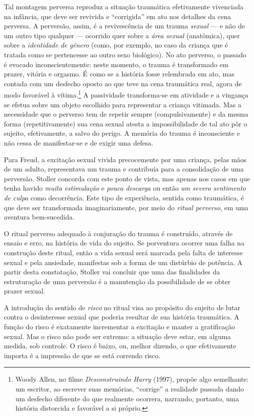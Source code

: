 Tal montagem perversa reproduz a situação traumática efetivamente
vivenciada na infância, que deve ser revivida e ``corrigida'' em ato nos
detalhes da cena perversa. A perversão, assim, é a revivescência de um
trauma \emph{sexual} --- e não de um outro tipo qualquer --- ocorrido
quer sobre a \emph{área sexual} (anatômica), quer sobre a
\emph{identidade de gênero} (como, por exemplo, no caso da criança que é
tratada como se pertencesse ao outro sexo biológico). No ato perverso, o
passado é evocado inconscientemente: neste momento, o trauma é
transformado em prazer, vitória e orgasmo. É como se a história fosse
relembrada em ato, mas contada com um desfecho oposto ao que teve na
cena traumática real, agora de modo favorável à vítima.\footnote{Woody
  Allen, no filme \emph{Desconstruindo Harry} (1997), propõe algo
  semelhante: um escritor, ao escrever suas memórias, ``corrige'' a
  realidade passada dando um desfecho diferente do que realmente
  ocorrera, narrando, portanto, uma história distorcida e favorável a si
  próprio.} A passividade transforma-se em atividade e a vingança se
efetua sobre um objeto escolhido para representar a criança vitimada.
Mas a necessidade que o perverso tem de repetir sempre (compulsivamente)
e da mesma forma (repetitivamente) sua cena sexual atesta a
impossibilidade de tal ato pôr o sujeito, efetivamente, a salvo do
perigo. A memória do trauma é inconsciente e não cessa de manifestar-se
e de exigir uma defesa.

Para Freud, a excitação sexual vivida precocemente por uma criança,
pelas mãos de um adulto, representava um trauma e contribuía para a
consolidação de uma perversão. Stoller concorda com este ponto de vista,
mas apenas nos casos em que tenha havido \emph{muita estimulação} e
\emph{pouca descarga} ou então \emph{um severo sentimento de culpa} como
decorrência. Este tipo de experiência, sentida como traumática, é que
deve ser transformada imaginariamente, por meio do \emph{ritual
perverso}, em uma aventura bem-sucedida.

O ritual perverso adequado à conjuração do trauma é construído, através
de ensaio e erro, na história de vida do sujeito. Se porventura ocorrer
uma falha na construção deste ritual, então a vida sexual será marcada
pela falta de interesse sexual e pela ansiedade, manifestas sob a forma
de um distúrbio de potência. A partir desta constatação, Stoller vai
concluir que uma das finalidades da estruturação de uma perversão é a
manutenção da possibilidade de se obter prazer sexual.

A introdução do sentido de \emph{risco} no ritual visa ao propósito do
sujeito de lutar contra o desinteresse sexual que poderia resultar de
sua história traumática. A função do risco é exatamente incrementar a
excitação e manter a gratificação sexual. Mas o risco não pode ser
extremo: a situação deve estar, em alguma medida, sob controle. O risco
é baixo, ou, melhor dizendo, o que efetivamente importa é a impressão de
que se está correndo risco.


